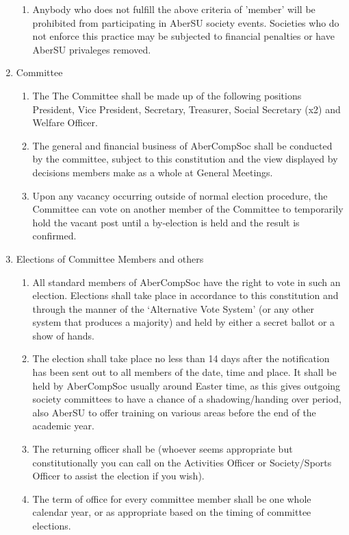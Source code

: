 \documentclass{article}
\begin{document}
\begin{enumerate}
\begin{enumerate}
            \item Anybody who does not fulfill the above criteria of 'member' will be prohibited from participating in AberSU society events. Societies who do not enforce this practice may be subjected to financial penalties or have AberSU privaleges removed.
        \end{enumerate}
    \item Committee
        \begin{enumerate}
            \item The The Committee shall be made up of the following positions President, Vice President, Secretary, Treasurer, Social Secretary (x2) and Welfare Officer.
            \item The general and financial business of AberCompSoc shall be conducted by the committee, subject to this constitution and the view displayed by decisions members make as a whole at General Meetings.
            \item Upon any vacancy occurring outside of normal election procedure, the Committee can vote on another member of the Committee to temporarily hold the vacant post until a by-election is held and the result is confirmed.
        \end{enumerate}
    \item Elections of Committee Members and others
        \begin{enumerate}
            \item All standard members of AberCompSoc have the right to vote in such an election. Elections shall take place in accordance to this constitution and through the manner of the ‘Alternative Vote System’ (or any other system that produces a majority) and held by either a secret ballot or a show of hands.
            \item The election shall take place no less than 14 days after the notification has been sent out to all members of the date, time and place. It shall be held by AberCompSoc usually around Easter time, as this gives outgoing society committees to have a chance of a shadowing/handing over period, also AberSU to offer training on various areas before the end of the academic year.
            \item The returning officer shall be (whoever seems appropriate but constitutionally you can call on the Activities Officer or Society/Sports Officer to assist the election if you wish).
            \item The term of office for every committee member shall be one whole calendar year, or as appropriate based on the timing of committee elections.

\end{enumerate}
\end{enumerate}
\end{document}
